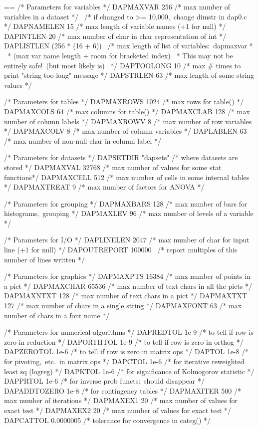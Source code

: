 \documentclass{book}
\makeatletter
\newenvironment{Texinfopreformatted}{%
  \par\GNUTobeylines\obeyspaces\frenchspacing\parskip=\z@\parindent=\z@}{}
{\catcode`\^^M=13 \gdef\GNUTobeylines{\catcode`\^^M=13 \def^^M{\null\par}}}
\newenvironment{Texinfoindented}{\begin{list}{}{}\item\relax}{\end{list}}
\renewcommand{\_}{\Texinfounderscore\discretionary{}{}{}}
\makeatother
\begin{document}
\begin{Texinfoindented}
\begin{Texinfopreformatted}%
\ttfamily /* Parameters for variables */
DAP\_MAXVAR 256  /* max number of variables in a dataset */
\                /* if changed to >= 10,000,\ change dimstr in dap0.c */
DAP\_NAMELEN 15  /* max length of variable names (+1 for null) */
DAP\_INTLEN 20  /* max number of char in char representation of int */
DAP\_LISTLEN (256 * (16 + 6))
\ /* max length of list of variables:\ dap\_maxvar *
\  * (max var name length + room for bracketed index)
\  * This may not be entirely safe!\ (but most likely is)
\  */
DAP\_TOOLONG 10 /* max \# times to print "string too long" message */
DAP\_STRLEN 63  /* max length of some string values */

/* Parameters for tables */
DAP\_MAXROWS 1024  /* max rows for table() */
DAP\_MAXCOLS 64  /* max columns for table() */
DAP\_MAXCLAB 128  /* max number of column labels */
DAP\_MAXROWV 8  /* max number of row variables */
DAP\_MAXCOLV 8  /* max number of column variables */
DAP\_LABLEN 63  /* max number of non-null char in column label */

/* Parameters for datasets */
DAP\_SETDIR "dap\_sets"  /* where datasets are stored */
DAP\_MAXVAL 32768  /* max number of values for some stat functions*/
DAP\_MAXCELL 512  /* max number of cells in some internal tables */
DAP\_MAXTREAT 9  /* max number of factors for ANOVA */

/* Parameters for grouping */
DAP\_MAXBARS 128  /* max number of bars for histograms,\ grouping */
DAP\_MAXLEV 96  /* max number of levels of a variable */

/* Parameters for I/O */
DAP\_LINELEN 2047  /* max number of char for input line (+1 for null) */
DAP\_OUTREPORT 100000
\   /* report multiples of this number of lines written */

/* Parameters for graphics */
DAP\_MAXPTS 16384  /* max number of points in a pict */
DAP\_MAXCHAR 65536  /* max number of text chars in all the picts */
DAP\_MAXNTXT 128  /* max number of text chars in a pict */
DAP\_MAXTXT 127   /* max number of chars in a single string */
DAP\_MAXFONT 63   /* max number of chars in a font name */

/* Parameters for numerical algorithms */
DAP\_REDTOL 1e-9 /* to tell if row is zero in reduction */
DAP\_ORTHTOL 1e-9 /* to tell if row is zero in orthog */
DAP\_ZEROTOL 1e-6 /* to tell if row is zero in matrix ops */
DAP\_TOL 1e-8    /* for pivoting,\ etc.\ in matrix ops */
DAP\_CTOL 1e-6   /* for iterative reweighted least sq (logreg) */
DAP\_KTOL 1e-6   /* for significance of Kolmogorov statistic */
DAP\_PRTOL 1e-6  /* for inverse prob functs:\ should disappear */
DAP\_ADDTOZERO 1e-8  /* for contingency tables */
DAP\_MAXITER 500 /* max number of iterations */
DAP\_MAXEX1 20  /* max number of values for exact test */
DAP\_MAXEX2 20  /* max number of values for exact test */
DAP\_CATTOL 0.0000005 /* tolerance for convergence in categ() */


\end{Texinfopreformatted}
\end{Texinfoindented}
\end{document}
